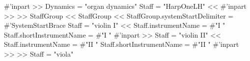 \documentclass[../../LilyPond-Tutorials]{subfiles}
\begin{document}
\begin{lilypondcode}
{                            \removeWithTag #'inpart { \killCues { \HarpOneRH } } >>
                     \new Dynamics = "organ dynamics" 
                            { \KeyboardCenteredDynamics \HarpOneDynamics }
                     \new Staff = "HarpOneLH" \with { 
                            \ShowEmptyStaves } << 
                            \removeWithTag #'inpart { \killCues { \HarpOneLH } } >>
              >> %
              \new StaffGroup \with { \WithinGroupSpacing } <<
                     \new StaffGroup \with { \ViolinsHeading } <<
                                   \set StaffGroup.systemStartDelimiter = #'SystemStartBrace
                                   \new Staff = "violin I"  << 
                                                 \set Staff.instrumentName = #"I "
                                                 \set Staff.shortInstrumentName = #"I "
                                                 \Metrics 
                                                 \removeWithTag #'inpart { 
                                                        \killCues { << 
                                                               \ViolinOneA 
                                                               \ViolinOneB >> 
                                                        } 
                                                 }
                                          >> %
                                   \new Staff = "violin II" \with { 
                                          \ShowEmptyStaves } << 
                                          \set Staff.instrumentName = #"II "
                                          \set Staff.shortInstrumentName = #"II "
                                          \removeWithTag #'inpart { 
                                                 \killCues { << 
                                                        \ViolinTwoA 
                                                        \ViolinTwoB >> 
                                                 } 
                                          }
                                   >> %
                     >> %
                     \new Staff = "viola" \with { 
}}
\end{lilypondcode}
\end{document}
